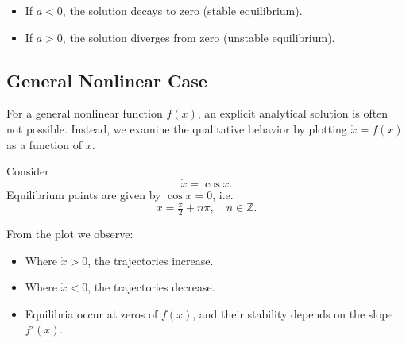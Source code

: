 \begin{itemize}
    \item If $a < 0$, the solution decays to zero (stable equilibrium).
    \item If $a > 0$, the solution diverges from zero (unstable equilibrium).
\end{itemize}

\subsection{General Nonlinear Case}
For a general nonlinear function $f(x)$, an explicit analytical solution is often not possible.  
Instead, we examine the qualitative behavior by plotting $\dot{x} = f(x)$ as a function of $x$.  

\begin{example}
Consider
\begin{equation}
    \dot{x} = \cos x.
\end{equation}
Equilibrium points are given by $\cos x = 0$, i.e.
\[
x = \tfrac{\pi}{2} + n\pi, \quad n \in \mathbb{Z}.
\]
\begin{center}
\end{center}
\end{example}



From the plot we observe:
\begin{itemize}
    \item Where $\dot{x} > 0$, the trajectories increase.
    \item Where $\dot{x} < 0$, the trajectories decrease.
    \item Equilibria occur at zeros of $f(x)$, and their stability depends on the slope $f'(x)$.
\end{itemize}

